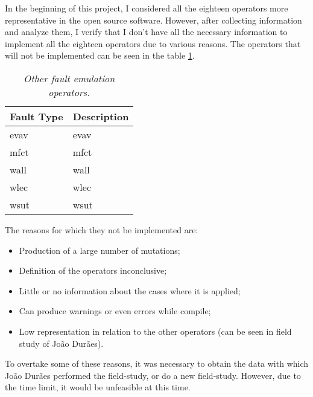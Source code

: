In the beginning of this project, I considered all the eighteen operators more representative in the open source software. However, after collecting information and analyze them, I verify that I don't have all the necessary information to implement all the eighteen operators due to various reasons.
The operators that will not be implemented can be seen in the table \ref{tab:otherfaultEmulationOperators}.

\begin{table}[!ht]
\begin{tabular}{|l|p{12cm}|}
\hline
\textbf{Fault Type}		& \multicolumn{1}{c|}{\textbf{Description}}		\\ \hline \hline
\acs{evav}        				& \Acl{evav}  									\\ \hline
\acs{mfct}        				& \Acl{mfct}  									\\ \hline
\acs{wall}       				& \Acl{wall} 									\\ \hline
\acs{wlec}       				& \Acl{wlec} 									\\ \hline
\acs{wsut}       				& \Acl{wsut} 									\\ \hline
\end{tabular}
\caption{\small \sl Other fault emulation operators.\label{tab:otherfaultEmulationOperators}}
\end{table}

The reasons for which they not be implemented are:

\begin{itemize}
	\item Production of a large number of mutations;
	\item Definition of the operators inconclusive;
	\item Little or no information about the cases where it is applied;
	\item Can produce warnings or even errors while compile;
	\item Low representation in relation to the other operators (can be seen in field study of João Durães).
\end{itemize}

To overtake some of these reasons, it was necessary to obtain the data with which João Durães performed the field-study, or do a new field-study. However, due to the time limit, it would be unfeasible at this time.


